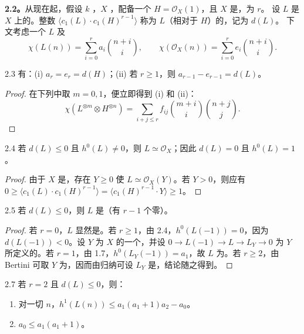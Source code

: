 \textbf{2.2。}从现在起，假设 $k$ ，$X$ ，配备一个 $H=\mathcal O_X(1)$，且 $X$ 是，为 $r$。
设 $L$ 是 $X$ 上的。整数 $\langle c_1(L)\cdot c_1(H)^{r-1}\rangle$ 称为 $L$（相对于 $H$）的，记为 $d(L)$。
下文考虑一个 $L$ 及
\[\chi(L(n))=\sum_{i=0}^r a_i\binom{n+i}{i},\qquad
\chi(\mathcal O_X(n))=\sum_{i=0}^r e_i\binom{n+i}{i}.\]
\begin{SGAresult}{}{2.3}
有：\textup{(i)} $a_r=e_r=d(H)$；\textup{(ii)} 若 $r\geq1$，则 $a_{r-1}-e_{r-1}=d(L)$。
\end{SGAresult}
\begin{proof}
在下列中取 $m=0,1$，便立即得到 (i) 和 (ii)：
\[\chi(L^{\otimes m}\otimes H^{\otimes n})=\sum_{i+j\leq r}f_{ij}\binom{m+i}{i}\binom{n+j}{j}.\]
\end{proof}
\begin{SGAresult}{}{2.4}
若 $d(L)\leq0$ 且 $h^0(L)\neq0$，则 $L\simeq\mathcal O_X$；因此 $d(L)=0$ 且 $h^0(L)=1$。
\end{SGAresult}
\begin{proof}
由于 $X$ 是，存在 $Y\geq0$ 使 $L\simeq\mathcal O_X(Y)$。若 $Y>0$，则应有 $0\geq\langle c_1(L)\cdot c_1(H)^{r-1}\rangle=\langle c_1(H)^{r-1}\cdot Y\rangle\geq1$。
\end{proof}
\begin{SGAresult}{}{2.5}
若 $d(L)\leq0$，则 $L$ 是（有 $r-1$ 个零）。
\end{SGAresult}
\begin{proof}
若 $r=0$，$L$ 显然是。若 $r\geq1$，由 2.4，$h^0(L(-1))=0$，因为 $d(L(-1))<0$。设 $Y$ 为 $X$ 的一个，并设 $0\to L(-1)\to L\to L_Y\to0$ 为 $Y$ 所定义的。若 $r=1$，由 1.7，$h^0(L_Y(-1))=a_1$，故 $L$ 为。若 $r\geq2$，由 Bertini 可取 $Y$ 为，因而由归纳可设 $L_Y$ 是，结论随之得到。
\end{proof}
\begin{SGAresult}{}{2.7}
若 $r=2$ 且 $d(L)\leq0$，则：
\begin{enumerate}
\item[(i)] 对一切 $n$，$h^1(L(n))\leq a_1(a_1+1)a_2-a_0$。
\item[(ii)] $a_0\leq a_1(a_1+1)$。
\end{enumerate}
\end{SGAresult}
